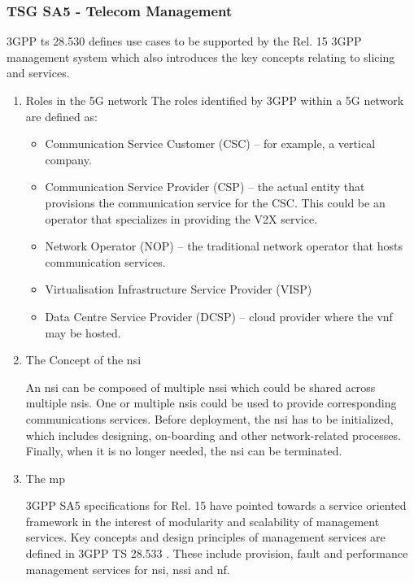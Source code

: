         \subsubsection{TSG SA5 - Telecom Management}
        3GPP \acrshort{ts} 28.530 \cite{3GPP_TS_28.530} defines use cases to be supported by the Rel. 15 3GPP management system which also introduces the key concepts relating to slicing and services.
        
        \begin{enumerate}
        
        \item Roles in the 5G network
        \newline
        The roles identified by 3GPP within a 5G network are defined as:
        \begin{itemize}
          \item Communication Service Customer (CSC) – for example, a vertical company.
          \item Communication Service Provider (CSP) – the actual entity that provisions the communication service for the CSC. This could be an operator that specializes in providing the V2X service. 
          \item Network Operator (NOP) – the traditional network operator that hosts communication services.
          \item Virtualisation Infrastructure Service Provider (VISP)
          \item Data Centre Service Provider (DCSP) – cloud provider where the \acrshort{vnf} may be hosted.
        \end{itemize}

        \item The Concept of the \acrfull{nsi}

        An \acrshort{nsi} can be composed of multiple \acrfull{nssi} which could be shared across multiple \acrshort{nsi}s. One or multiple \acrshort{nsi}s could be used to provide corresponding communications services. Before deployment, the \acrshort{nsi} has to be initialized, which includes designing, on-boarding and other network-related processes. Finally, when it is no longer needed, the \acrshort{nsi} can be terminated.

        \item The \acrfull{mp}

        3GPP SA5 specifications for Rel. 15 have pointed towards a service oriented framework in the interest of modularity and scalability of management services. Key concepts and design principles of management services are defined in 3GPP TS 28.533 \cite{3GPP_TS_28.533}. These include provision, fault and performance management services for \acrshort{nsi}, \acrshort{nssi} and \acrshort{nf}.


\end{enumerate}
